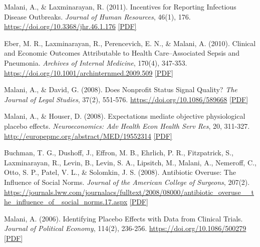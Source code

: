 \begin{tablist}
        \item[2011] \tab{}Malani, A., \& Laxminarayan, R. (2011). Incentives for Reporting Infectious Disease Outbreaks. \textit{Journal of Human Resources}, 46(1), 176. \href{https://doi.org/10.3368/jhr.46.1.176}{https://doi.org/10.3368/jhr.46.1.176} \href{https://github.com/anup-malani/website_personal/blob/main/publications/2011_MalaniLaxminarayan_JHR_IncentivesDiseaseReporting.pdf}{[PDF]} 
    
        \item[2010] \tab{}Eber, M. R., Laxminarayan, R., Perencevich, E. N., \& Malani, A. (2010). Clinical and Economic Outcomes Attributable to Health Care–Associated Sepsis and Pneumonia. \textit{Archives of Internal Medicine}, 170(4), 347-353. \href{https://doi.org/10.1001/archinternmed.2009.509}{https://doi.org/10.1001/archinternmed.2009.509} \href{https://github.com/anup-malani/website_personal/blob/main/publications/2010_EberMalani_ArchiveIntMed_HAI.pdf}{[PDF]} 
        
        \item[2008] \tab{}Malani, A., \& David, G. (2008). Does Nonprofit Status Signal Quality? \textit{The Journal of Legal Studies}, 37(2), 551-576. \href{https://doi.org/10.1086/589668}{https://doi.org/10.1086/589668} \href{https://github.com/anup-malani/website_personal/blob/main/publications/2008_Malani_JLS_NonProfitSignalQuality.pdf}{[PDF]} 
        
        \item[2008] \tab{}Malani, A., \& Houser, D. (2008). Expectations mediate objective physiological placebo effects. \textit{Neuroeconomics: Adv Health Econ Health Serv Res}, 20, 311-327. \href{http://europepmc.org/abstract/MED/19552314}{http://europepmc.org/abstract/MED/19552314}  \href{https://github.com/anup-malani/website_personal/blob/main/publications/2008_Malani_Neuroecon_CaffeinePlacebo.pdf}{[PDF]} 

        \item[2008] \tab{}Buchman, T. G., Dushoff, J., Effron, M. B., Ehrlich, P. R., Fitzpatrick, S., Laxminarayan, R., Levin, B., Levin, S. A., Lipsitch, M., Malani, A., Nemeroff, C., Otto, S. P., Patel, V. L., \& Solomkin, J. S. (2008). Antibiotic Overuse: The Influence of Social Norms. \textit{Journal of the American College of Surgeons}, 207(2). \href{https://journals.lww.com/journalacs/fulltext/2008/08000/antibiotic_overuse__the_influence_of_social_norms.17.aspx}{https://journals.lww.com/journalacs/fulltext/2008/08000/antibiotic\_overuse\_\_the\_influence\_of\_ social\_norms.17.aspx}   \href{https://github.com/anup-malani/website_personal/blob/main/publications/2008_BuchmanMalani_AbxOveruse.pdf}{[PDF]} 
        
        \item[2006] \tab{}Malani, A. (2006). Identifying Placebo Effects with Data from Clinical Trials. \textit{Journal of Political Economy}, 114(2), 236-256. \href{https://doi.org/10.1086/500279}{https://doi.org/10.1086/500279} \href{https://github.com/anup-malani/website_personal/blob/main/publications/2006_Malani_JPE_PlaceboEffects.pdf}{[PDF]}
        
    \end{tablist}
    
